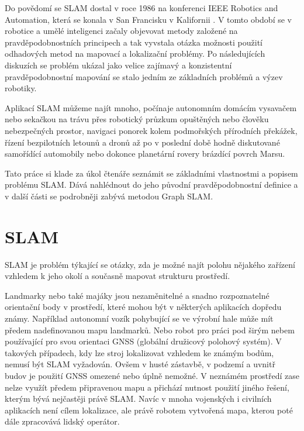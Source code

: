 \documentclass[12pt,a4paper]{article}
\begin{document}
Do povědomí se SLAM dostal v roce 1986 na konferenci IEEE Robotics and Automation, která se konala v San Francisku v Kalifornii \cite{Durrant-Whyte}. V tomto období se v robotice a umělé inteligenci začaly objevovat metody založené na pravděpodobnostních principech a tak vyvstala otázka možnosti použití odhadových metod na mapovací a lokalizační problémy. Po následujících diskuzích se problém ukázal jako velice zajímavý a konzistentní pravděpodobnostní mapování se stalo jedním ze základních problémů a výzev robotiky.

Aplikací SLAM můžeme najít mnoho, počínaje autonomním domácím vysavačem nebo sekačkou na trávu přes robotický průzkum opuštěných nebo člověku nebezpečných prostor, navigaci ponorek kolem podmořských přírodních překážek, řízení bezpilotních letounů a dronů až po v poslední době hodně diskutované samořídící automobily nebo dokonce planetární rovery brázdící povrch Marsu.

Tato práce si klade za úkol čtenáře seznámit se základními vlastnostmi a popisem problému SLAM. Dává nahlédnout do jeho původní pravděpodobnostní definice a v další části se podrobněji zabývá metodou Graph SLAM. 


\newpage
\section{SLAM}
SLAM je problém týkající se otázky, zda je možné najít polohu nějakého zařízení vzhledem k jeho okolí a současně mapovat strukturu prostředí.

Landmarky nebo také majáky jsou nezaměnitelné a snadno rozpoznatelné orientační body v prostředí, které mohou být v některých aplikacích dopředu známy. Například autonomní vozík pohybující se ve výrobní hale může mít předem nadefinovanou mapu landmarků. Nebo robot pro práci pod širým nebem používající pro svou orientaci GNSS (globální družicový polohový systém). V takových případech, kdy lze stroj lokalizovat vzhledem ke známým bodům, nemusí být SLAM vyžadován. Ovšem v husté zástavbě, v podzemí a uvnitř budov je použití GNSS omezené nebo úplně nemožné. V neznámém prostředí zase nelze využít předem připravenou mapu a přichází nutnost použití jiného řešení, kterým bývá nejčastěji právě SLAM. Navíc v mnoha vojenských i civilních aplikacích není cílem lokalizace, ale právě robotem vytvořená mapa, kterou poté dále zpracovává lidský operátor.
\end{document}
